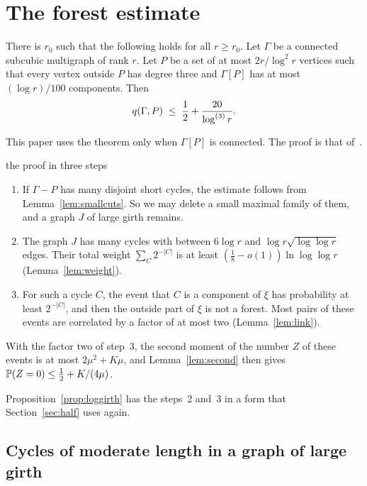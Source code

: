 \section{The forest estimate}\label{sec:forest}

\begin{theorem}\label{thm:forest}
There is $r_0$ such that the following holds for all $r\ge r_0$. Let $\Gamma$ be a connected
subcubic multigraph of rank $r$. Let $P$ be a set of at most $2r/\log^{2}r$ vertices such that
every vertex outside $P$ has degree three and $\Gamma[P]$ has at most $(\log r)/100$ components.
Then
\[
  q(\Gamma,P)\;\le\;\frac12+\frac{20}{\log^{(3)}r}.
\]
\end{theorem}

This paper uses the theorem only when $\Gamma[P]$ is connected. The proof is that of~\cite{KNT}.

\begin{idea}{the proof in three steps}
\begin{enumerate}[leftmargin=1.5em]
\item If $\Gamma-P$ has many disjoint short cycles, the estimate follows from
Lemma~\ref{lem:smallcuts}. So we may delete a small maximal family of them, and a graph $J$ of
large girth remains.
\item The graph $J$ has many cycles with between $6\log r$ and $\log r\sqrt{\log\log r}$ edges.
Their total weight $\sum_C2^{-|C|}$ is at least $(\frac18-o(1))\ln\log\log r$
(Lemma~\ref{lem:weight}).
\item For such a cycle $C$, the event that $C$ is a component of $\xi$ has probability at least
$2^{-|C|}$, and then the outside part of $\xi$ is not a forest. Most pairs of these events are
correlated by a factor of at most two (Lemma~\ref{lem:link}).
\end{enumerate}
With the factor two of step~3, the second moment of the number $Z$ of these events is at most
$2\mu^{2}+K\mu$, and Lemma~\ref{lem:second} then gives $\mathbb{P}(Z=0)\le\tfrac12+K/(4\mu)$.
\end{idea}

Proposition~\ref{prop:loggirth} has the steps~2 and~3 in a form that Section~\ref{sec:half} uses
again.

\subsection{Cycles of moderate length in a graph of large girth}\label{sec:moderate}

